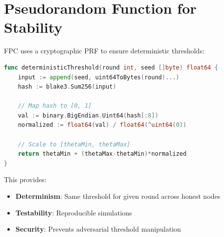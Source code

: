 \section{Pseudorandom Function for Stability}

\label{sec:prf}

FPC uses a cryptographic PRF to ensure deterministic thresholds:

\begin{lstlisting}[language=Go, caption=PRF-based threshold stability]
func deterministicThreshold(round int, seed []byte) float64 {
    input := append(seed, uint64ToBytes(round)...)
    hash := blake3.Sum256(input)
    
    // Map hash to [0, 1]
    val := binary.BigEndian.Uint64(hash[:8])
    normalized := float64(val) / float64(^uint64(0))
    
    // Scale to [thetaMin, thetaMax]
    return thetaMin + (thetaMax-thetaMin)*normalized
}
\end{lstlisting}

This provides:
\begin{itemize}
\item \textbf{Determinism}: Same threshold for given round across honest nodes
\item \textbf{Testability}: Reproducible simulations
\item \textbf{Security}: Prevents adversarial threshold manipulation
\end{itemize}

